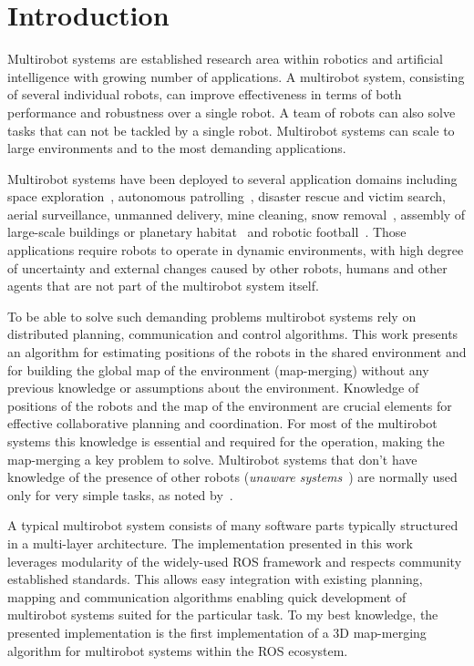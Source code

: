 \chapter*{Introduction}

Multirobot systems are established research area within robotics and artificial intelligence with growing number of applications. A multirobot system, consisting of several individual robots, can improve effectiveness in terms of both performance and robustness over a single robot. A team of robots can also solve tasks that can not be tackled by a single robot. Multirobot systems can scale to large environments and to the most demanding applications.

Multirobot systems have been deployed to several application domains including space exploration~\citep{goldberg2002distributedspace,huntsberger2003campout}, autonomous patrolling~\citep{parker2003parolling100}, disaster rescue and victim search, aerial surveillance, unmanned delivery, mine cleaning, snow removal~\citep{choset2001coverage}, assembly of large-scale buildings or planetary habitat~\citep{goldberg2002distributedspace} and robotic football~\citep{asada1999robocup}. Those applications require robots to operate in  dynamic environments, with high degree of uncertainty and external changes caused by other robots, humans and other agents that are not part of the multirobot system itself.

To be able to solve such demanding problems multirobot systems rely on distributed planning, communication and control algorithms. This work presents an algorithm for estimating positions of the robots in the shared environment and for building the global map of the environment (map-merging) without any previous knowledge or assumptions about the environment. Knowledge of positions of the robots and the map of the environment are crucial elements for effective collaborative planning and coordination. For most of the multirobot systems this knowledge is essential and required for the operation, making the map-merging a key problem to solve. Multirobot systems that don't have knowledge of the presence of other robots (\textit{unaware systems}~\citep{farinelli2004multirobot}) are normally used only for very simple tasks, as noted by~\citet{farinelli2004multirobot}.

A typical multirobot system consists of many software parts typically structured in a multi-layer architecture. The implementation presented in this work leverages modularity of the widely-used \gls{ROS} framework and respects community established standards. This allows easy integration with existing planning, mapping and communication algorithms enabling quick development of multirobot systems suited for the particular task. To my best knowledge, the presented implementation is the first implementation of a \gls{3D} map-merging algorithm for multirobot systems within the \gls{ROS} ecosystem.

